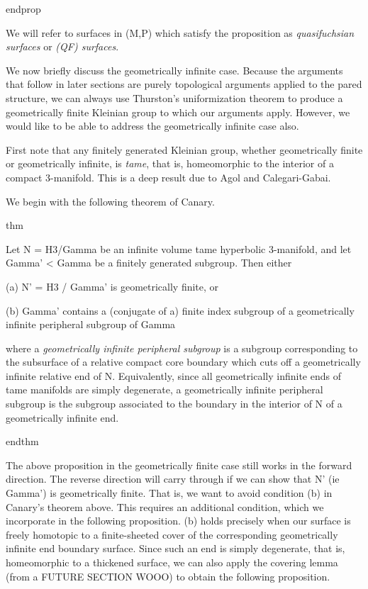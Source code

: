 endprop

We will refer to surfaces in (M,P) which satisfy the proposition as
\emph{quasifuchsian surfaces} or \emph{(QF) surfaces}.

We now briefly discuss the geometrically infinite case. Because the arguments
that follow in later sections are purely topological arguments applied to the
pared structure, we can always use Thurston's uniformization theorem to produce
a geometrically finite Kleinian group to which our arguments apply. However, we
would like to be able to address the geometrically infinite case also.

First note that any finitely generated Kleinian group, whether geometrically
finite or geometrically infinite, is \emph{tame}, that is, homeomorphic to the
interior of a compact 3-manifold. This is a deep result due to Agol and
Calegari-Gabai.

We begin with the following theorem of Canary.

thm

Let N = H3/Gamma be an infinite volume tame hyperbolic 3-manifold, and let
Gamma' < Gamma be a finitely generated subgroup. Then either

(a) N' = H3 / Gamma' is geometrically finite, or

(b) Gamma' contains a (conjugate of a) finite index subgroup of a geometrically
infinite peripheral subgroup of Gamma

where a \emph{geometrically infinite peripheral subgroup} is a subgroup
corresponding to the subsurface of a relative compact core boundary which cuts
off a geometrically infinite relative end of N. Equivalently, since all
geometrically infinite ends of tame manifolds are simply degenerate,
a geometrically infinite peripheral subgroup is the subgroup associated to the
boundary in the interior of N of a geometrically infinite end.

endthm

The above proposition in the geometrically finite case still works in the
forward direction. The reverse direction will carry through if we can show that
N' (ie Gamma') is geometrically finite. That is, we want to avoid condition (b)
in Canary's theorem above. This requires an additional condition, which we
incorporate in the following proposition. (b) holds precisely when our surface
is freely homotopic to a finite-sheeted cover of the corresponding
geometrically infinite end boundary surface. Since such an end is simply
degenerate, that is, homeomorphic to a thickened surface, we can also apply the
covering lemma (from a FUTURE SECTION WOOO) to obtain the following
proposition.

